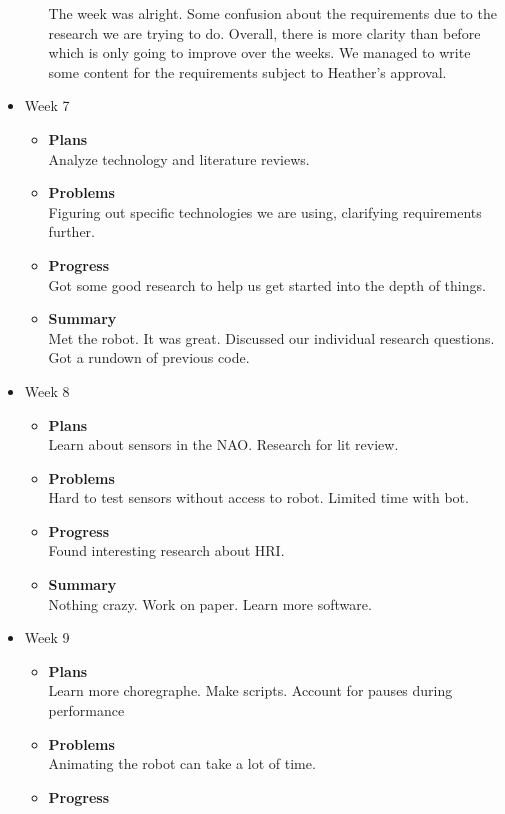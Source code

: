 \begin{itemize}
\begin{itemize}
				The week was alright. Some confusion about the requirements due to the research we are trying to do. Overall, there is more clarity than before which is only going to improve over the weeks. 
We managed to write some content for the requirements subject to Heather's approval. 
			\end{itemize}
		\item{Week 7}
			\begin{itemize}
				\item \textbf{Plans} \\
				Analyze technology and literature reviews.
				\item \textbf{Problems} \\
				Figuring out specific technologies we are using, clarifying requirements further.
				\item \textbf{Progress} \\
				Got some good research to help us get started into the depth of things.
				\item \textbf{Summary} \\
				Met the robot. It was great. Discussed our individual research questions. Got a rundown of previous code.
			\end{itemize}
		\item{Week 8}
			\begin{itemize}
				\item \textbf{Plans} \\
				Learn about sensors in the NAO. Research for lit review.
				\item \textbf{Problems} \\
				Hard to test sensors without access to robot. Limited time with bot.
				\item \textbf{Progress} \\
				Found interesting research about HRI.
				\item \textbf{Summary} \\
				Nothing crazy. Work on paper. Learn more software.
			\end{itemize}
		\item{Week 9}
			\begin{itemize}
				\item \textbf{Plans} \\
				Learn more choregraphe. Make scripts. Account for pauses during performance
				\item \textbf{Problems} \\
				Animating the robot can take a lot of time.
				\item \textbf{Progress} \\

\end{itemize}
\end{itemize}
